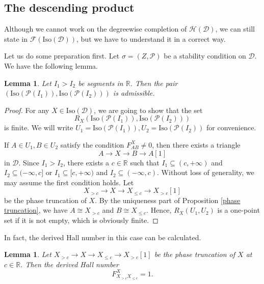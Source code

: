 \documentclass[a4paper,12pt]{amsart}
\numberwithin{equation}{section}
\newtheorem{lemma}[theorem]{Lemma}
\newcommand{\Iso}{\mathrm{Iso}}
\newcommand{\1}{\mathbf{1}}
\begin{document}
\subsection{The descending product}
Although we cannot work on the degreewise completion of $\mathcal{H}(\mathcal{D})$, we can still state \cite[Theorem 4.19]{GX2025} in $\mathscr{F}(\Iso(\mathcal{D}))$, but we have to understand it in a correct way.

Let us do some preparation first. Let $\sigma=(Z,\mathcal{P})$ be a stability condition on $\mathcal{D}$. We have the following lemma.
\begin{lemma}\label{segment admissible}
    Let $I_1>I_2$ be segments in $\mathbb{R}$. Then the pair $(\Iso(\mathcal{P}(I_1)),\Iso(\mathcal{P}(I_2)))$ is admissible.
\end{lemma}
\begin{proof}
    For any $X\in\Iso(\mathcal{D})$, we are going to show that the set
    \[R_X(\Iso(\mathcal{P}(I_1)),\Iso(\mathcal{P}(I_2)))
    \] is finite. We will write $U_1=\Iso(\mathcal{P}(I_1)),U_2=\Iso(\mathcal{P}(I_2))$ for convenience.

    If $A\in U_1,B\in U_2$ satisfy the condition $F_{AB}^X\neq0$, then there exists a triangle
    \[A\rightarrow X\rightarrow B\rightarrow A[1]\]
    in $\mathcal{D}$. Since $I_1>I_2$, there exists a $c\in\mathbb{R}$ such that $I_1\subseteq(c,+\infty)$ and $I_2\subseteq(-\infty,c]$ or $I_1\subseteq[c,+\infty)$ and $I_2\subseteq(-\infty,c)$. Without loss of generality, we may assume the first condition holds. Let
    \[X_{>c}\rightarrow X\rightarrow X_{\leqslant c}\rightarrow X_{>c}[1]\]
    be the phase truncation of $X$. By the uniqueness part of Proposition \ref{phase truncation}, we have $A\cong X_{>c}$ and $B\cong X_{\leqslant c}$. Hence, $R_X(U_1,U_2)$ is a one-point set if it is not empty, which is obviously finite.
\end{proof}
In fact, the derived Hall number in this case can be calculated.
\begin{lemma}\label{truncation hall number 1}
    Let $X_{>c}\rightarrow X\rightarrow X_{\leqslant c}\rightarrow X_{>c}[1]$ be the phase truncation of $X$ at $c\in\mathbb{R}$. Then the derived Hall number
    \[F_{X_{>c}X_{\leqslant c}}^X=1.\]
\end{lemma}
\end{document}
